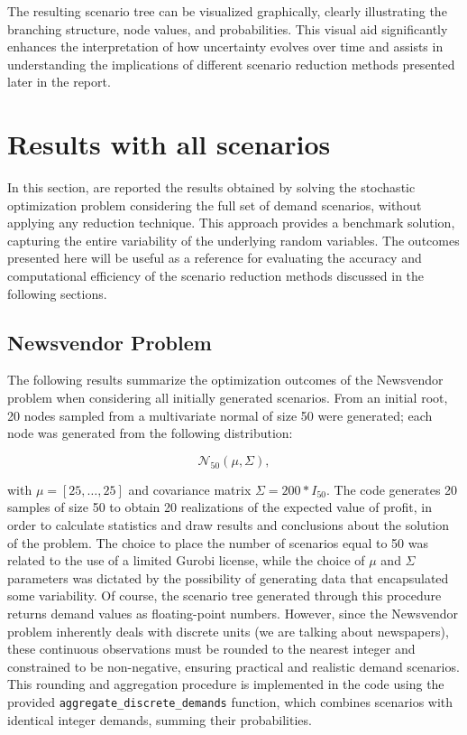 \documentclass[a4paper,12pt]{article}
\begin{document}
	\noindent The resulting scenario tree can be visualized graphically, clearly illustrating the branching structure, node values, and probabilities. This visual aid significantly enhances the interpretation of how uncertainty evolves over time and assists in understanding the implications of different scenario reduction methods presented later in the report.
	
	
	\section{Results with all scenarios}
	
	In this section, are reported the results obtained by solving the stochastic optimization problem considering the full set of demand scenarios, without applying any reduction technique. This approach provides a benchmark solution, capturing the entire variability of the underlying random variables. The outcomes presented here will be useful as a reference for evaluating the accuracy and computational efficiency of the scenario reduction methods discussed in the following sections.
	
	\subsection{Newsvendor Problem}
	
	The following results summarize the optimization outcomes of the Newsvendor problem when considering all initially generated scenarios. From an initial root, 20 nodes sampled from a multivariate normal of size 50 were generated; each node was generated from the following distribution: 
	
	\[
	\mathcal{N}_{50}(\mu, \Sigma),
	\]
	
	 with $\mu = [25,\dots,25]$ and covariance matrix $\Sigma = 200 * I_{50}$. The code generates 20 samples of size 50 to obtain 20 realizations of the expected value of profit, in order to calculate statistics and draw results and conclusions about the solution of the problem.
	 The choice to place the number of scenarios equal to 50 was related to the use of a limited Gurobi license, while the choice of $\mu$ and $\Sigma$ parameters was dictated by the possibility of generating data that encapsulated some variability.
	\noindent Of course, the scenario tree generated through this procedure returns demand values as floating-point numbers. However, since the Newsvendor problem inherently deals with discrete units (we are talking about newspapers), these continuous observations must be rounded to the nearest integer and constrained to be non-negative, ensuring practical and realistic demand scenarios. This rounding and aggregation procedure is implemented in the code using the provided \texttt{aggregate\_discrete\_demands} function, which combines scenarios with identical integer demands, summing their probabilities.\\
	
\end{document}
